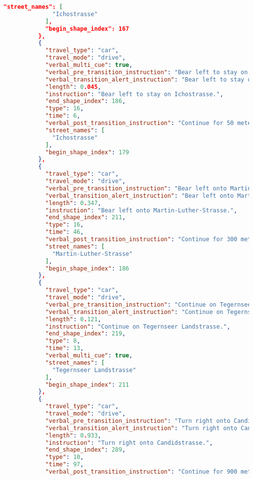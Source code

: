 \begin{lstlisting}[language=json,breaklines=true]
            "street_names": [
              "Ichostrasse"
            ],
            "begin_shape_index": 167
          },
          {
            "travel_type": "car",
            "travel_mode": "drive",
            "verbal_multi_cue": true,
            "verbal_pre_transition_instruction": "Bear left to stay on Ichostrasse. Then Bear left onto Martin-Luther-Strasse.",
            "verbal_transition_alert_instruction": "Bear left to stay on Ichostrasse.",
            "length": 0.045,
            "instruction": "Bear left to stay on Ichostrasse.",
            "end_shape_index": 186,
            "type": 16,
            "time": 6,
            "verbal_post_transition_instruction": "Continue for 50 meters.",
            "street_names": [
              "Ichostrasse"
            ],
            "begin_shape_index": 179
          },
          {
            "travel_type": "car",
            "travel_mode": "drive",
            "verbal_pre_transition_instruction": "Bear left onto Martin-Luther-Strasse.",
            "verbal_transition_alert_instruction": "Bear left onto Martin-Luther-Strasse.",
            "length": 0.347,
            "instruction": "Bear left onto Martin-Luther-Strasse.",
            "end_shape_index": 211,
            "type": 16,
            "time": 46,
            "verbal_post_transition_instruction": "Continue for 300 meters.",
            "street_names": [
              "Martin-Luther-Strasse"
            ],
            "begin_shape_index": 186
          },
          {
            "travel_type": "car",
            "travel_mode": "drive",
            "verbal_pre_transition_instruction": "Continue on Tegernseer Landstrasse for 100 meters. Then Turn right onto Candidstrasse.",
            "verbal_transition_alert_instruction": "Continue on Tegernseer Landstrasse.",
            "length": 0.121,
            "instruction": "Continue on Tegernseer Landstrasse.",
            "end_shape_index": 219,
            "type": 8,
            "time": 13,
            "verbal_multi_cue": true,
            "street_names": [
              "Tegernseer Landstrasse"
            ],
            "begin_shape_index": 211
          },
          {
            "travel_type": "car",
            "travel_mode": "drive",
            "verbal_pre_transition_instruction": "Turn right onto Candidstrasse.",
            "verbal_transition_alert_instruction": "Turn right onto Candidstrasse.",
            "length": 0.933,
            "instruction": "Turn right onto Candidstrasse.",
            "end_shape_index": 289,
            "type": 10,
            "time": 97,
            "verbal_post_transition_instruction": "Continue for 900 meters.",

\end{lstlisting}
